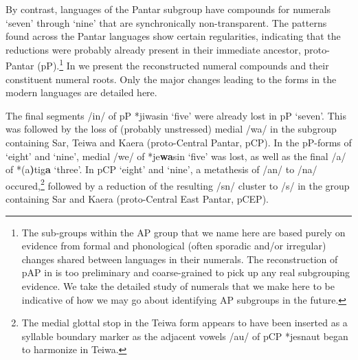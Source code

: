 \let\eachwordone=\it
\let\eachwordtwo=\rm
\let\eachwordthree=\rm
\let\eachwordfour=\rm
\let\eachwordfive=\rm
\let\eachwordsix=\rm
\let\eachwordseven=\rm

By contrast, languages of the Pantar subgroup have compounds for numerals `seven' through `nine' that are synchronically non-transparent. The patterns found across the Pantar languages show certain regularities, indicating that the reductions were probably already present in their immediate ancestor, proto-Pantar (pP).\footnote{The sub-groups within the AP group that we name here are based purely on evidence from formal and phonological (often sporadic and/or irregular) changes shared between languages in their numerals. The reconstruction of pAP in \citet{HoltonEtAl2012} is too preliminary and coarse-grained to pick up any real subgrouping evidence. We take the detailed study of numerals that we make here to be indicative of how we may go about identifying AP subgroups in the future.}  In  we present the reconstructed numeral compounds and their constituent numeral roots. Only the major changes leading to the forms in the modern languages are detailed here. 

  The final segments /in/ of pP *jiwasin `five' were already lost in pP `seven'. This was followed by the loss of (probably unstressed) medial /wa/ in the subgroup containing Sar, Teiwa and Kaera (proto-Central Pantar, pCP). In the pP-forms of `eight' and `nine', medial /we/ of *je\textbf{wa}sin `five' was lost, as well as the final /a/ of *(a\textbf{)}tig\textbf{a} `three'. In pCP `eight' and `nine', a metathesis of /an/ to /na/ occured,\footnote{The medial glottal stop in the Teiwa form appears to have been inserted as a syllable boundary marker as the adjacent vowels /au/ of pCP *jesnaut began to harmonize in Teiwa.}  followed by a reduction of the resulting /sn/ cluster to /s/ in the group containing Sar and Kaera (proto-Central East Pantar, pCEP). 




